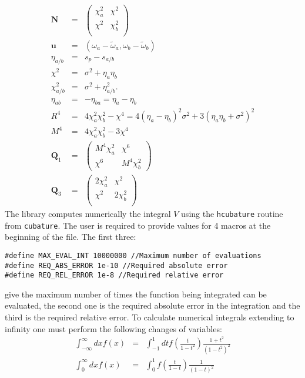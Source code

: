 \documentclass[10pt,letterpaper]{article}
\begin{document}
\begin{eqnarray}\label{Nu}
\mathbf{N}&=& \left(
\begin{array}{cc}
\chi_a^2 & \chi^2 \\
\chi^2 & \chi_b^2 \\
\end{array}
\right)\\ 
\mathbf{u}&=&(\omega_a-\tilde \omega_a,\omega_b-\tilde \omega_b) \nonumber\\
\eta _{a/b}&=&s_p-s_{a/b} \nonumber\\
\chi ^2&=&\sigma ^2+\eta _a \eta _b \nonumber\\
\chi _{a/b}^2&=&\sigma ^2+\eta _{a/b}^2. \nonumber\\
\eta_{ab} &=&-\eta_{ba}=\eta _a-\eta _b \nonumber\\
R^4&=&4 \chi_a^2 \chi_b^2-\chi^4=4(\eta_a-\eta_b)^2 \sigma^2+3 (\eta_a \eta_b+\sigma^2)^2 \nonumber\\
M^4&=&4 \chi_a^2 \chi_b^2-3\chi^4\nonumber\\
\mathbf{Q}_1&=&
\left(
\begin{array}{cc}
M^4 \chi _a^2 & \chi ^6 \\
\chi ^6 & M^4 \chi _b^2
\end{array}
\right)\\
\mathbf{Q}_3&=&
\left(
\begin{array}{cc}
2  \chi _a^2 &  \chi ^2  \\
 \chi ^2  & 2  \chi _b^2 \\
\end{array}
\right)
\end{eqnarray}
The library computes numerically the integral $V$ using the \verb|hcubature| routine from \verb|cubature|.
The user is required to provide values for 4 macros at the beginning of the file. The first three:
\begin{verbatim}
#define MAX_EVAL_INT 10000000 //Maximum number of evaluations
#define REQ_ABS_ERROR 1e-10 //Required absolute error
#define REQ_REL_ERROR 1e-8 //Required relative error   
\end{verbatim}
give the maximum number of times the function being integrated can be evaluated, the second one is the required absolute error in the integration and the third is the required relative error. 
To calculate numerical integrals extending to infinity one must perform the following changes of variables:
\begin{eqnarray}\label{cv}
\int_{-\infty}^\infty dx f(x)&=&\int_{-1}^1 dt f\left(\frac{t}{1-t^2}\right) \frac{1+t^2}{(1-t^2)^2}\\
\int_{0}^{\infty} dx f(x) &=& \int_0^1 f\left(\frac{t}{1-t} \right) \frac{1}{(1-t)^2}\nonumber
\end{eqnarray}
\end{document}
